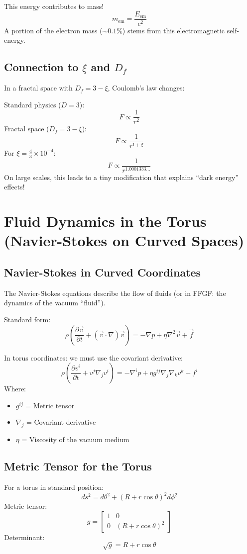 \documentclass[12pt,a4paper]{article}
\begin{document}
This energy contributes to mass!
\[
m_{\text{em}} = \frac{E_{\text{em}}}{c^2}
\]
A portion of the electron mass (\( \sim 0.1\% \)) stems from this electromagnetic self-energy.

\subsection{Connection to \( \xi \) and \( D_f \)}
In a fractal space with \( D_f = 3 - \xi \), Coulomb's law changes:

Standard physics (\( D = 3 \)):
\[
F \propto \frac{1}{r^2}
\]
Fractal space (\( D_f = 3 - \xi \)):
\[
F \propto \frac{1}{r^{1 + \xi}}
\]
For \( \xi = \frac{4}{3} \times 10^{-4} \):
\[
F \propto \frac{1}{r^{1.0001333\ldots}}
\]
On large scales, this leads to a tiny modification that explains ``dark energy'' effects!

\section{Fluid Dynamics in the Torus (Navier-Stokes on Curved Spaces)}
\subsection{Navier-Stokes in Curved Coordinates}
The Navier-Stokes equations describe the flow of fluids (or in FFGF: the dynamics of the vacuum ``fluid'').

Standard form:
\[
\rho\left(\frac{\partial \vec{v}}{\partial t} + (\vec{v} \cdot \nabla) \vec{v}\right) = -\nabla p + \eta \nabla^2 \vec{v} + \vec{f}
\]

In torus coordinates: we must use the covariant derivative:
\[
\rho\left(\frac{\partial v^i}{\partial t} + v^j \nabla_j v^i\right) = -\nabla^i p + \eta g^{ij} \nabla_j \nabla_k v^k + f^i
\]
Where:
\begin{itemize}
	\item \( g^{ij} \) = Metric tensor
	\item \( \nabla_j \) = Covariant derivative
	\item \( \eta \) = Viscosity of the vacuum medium
\end{itemize}

\subsection{Metric Tensor for the Torus}
For a torus in standard position:
\[
ds^2 = d\theta^2 + (R + r \cos \theta)^2 d\phi^2
\]
Metric tensor:
\[
g = \begin{bmatrix}
	1 & 0 \\
	0 & (R + r \cos \theta)^2
\end{bmatrix}
\]
Determinant:
\[
\sqrt{g} = R + r \cos \theta
\]
\end{document}
